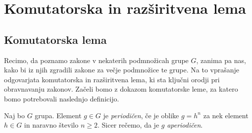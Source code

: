 \documentclass[mat1, tisk]{fmfdelo}
\numberwithin{equation}{section}  %
\newenvironment{skica}[1][Skica dokaza]{\begin{proof}[#1]}{\end{proof}}
\begin{document}
\section{Komutatorska in razširitvena lema}

\subsection{Komutatorska lema}



Recimo, da poznamo zakone v nekaterih podmnožicah grupe $G$, zanima pa nas, kako bi iz njih zgradili zakone za večje podmnožice te grupe. Na to vprašanje odgovarjata komutatorska in razširitvena lema,
ki sta ključni orodji pri obravnavanju zakonov. Začeli bomo z dokazom komutatorske leme, za katero bomo potrebovali naslednjo definicijo.

\begin{definicija}\label{def_netrivialna_potenca}
Naj bo $G$ grupa. Element $g \in  G$ je \emph{periodičen}, če je oblike $g = h^{n}$ za nek element $h \in G$ in naravno število $n \ge  2$. Sicer rečemo, da je $g$ \emph{aperiodičen}.
\end{definicija}




\end{document}
